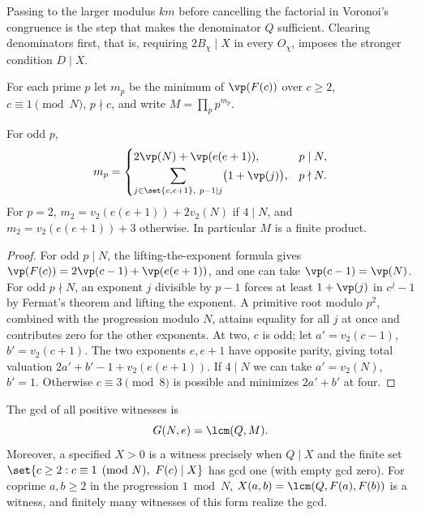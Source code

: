Passing to the larger modulus $km$ before cancelling the factorial in
Voronoi's congruence is the step that makes the denominator $Q$ sufficient.
Clearing denominators first, that is, requiring $2B_\chi\mid X$ in every
$O_\chi$, imposes the stronger condition $D\mid X$.

For each prime $p$ let $m_p$ be the minimum of $\vp(F(c))$ over $c\ge2$,
$c\equiv1\pmod N$, $p\nmid c$, and write $M=\prod_pp^{m_p}$.

\begin{lemma}\label{spn:lem:mp}
For odd $p$,
\begin{equation}\label{spn:eq:mp}
 m_p=\begin{cases}
 2\vp(N)+\vp(e(e+1)),&p\mid N,\\[2pt]
 \displaystyle\sum_{j\in\set{e,e+1},\ p-1\mid j}\bigl(1+\vp(j)\bigr),&p\nmid N .
 \end{cases}
\end{equation}
For $p=2$, $m_2=v_2(e(e+1))+2v_2(N)$ if $4\mid N$, and
$m_2=v_2(e(e+1))+3$ otherwise. In particular $M$ is a finite product.
\end{lemma}

\begin{proof}
For odd $p\mid N$, the lifting-the-exponent formula gives
$\vp(F(c))=2\vp(c-1)+\vp(e(e+1))$, and one can take $\vp(c-1)=\vp(N)$. For
odd $p\nmid N$, an exponent $j$ divisible by $p-1$ forces at least
$1+\vp(j)$ in $c^j-1$ by Fermat's theorem and lifting the exponent. A
primitive root modulo $p^2$, combined with the progression modulo $N$,
attains equality for all $j$ at once and contributes zero for the other
exponents. At two, $c$ is odd; let $a'=v_2(c-1)$, $b'=v_2(c+1)$. The two
exponents $e,e+1$ have opposite parity, giving total valuation
$2a'+b'-1+v_2(e(e+1))$. If $4\mid N$ we can take $a'=v_2(N)$, $b'=1$.
Otherwise $c\equiv3\pmod8$ is possible and minimizes $2a'+b'$ at four.
\end{proof}

\begin{theorem}\label{spn:thm:gcd}
The gcd of all positive witnesses is
\begin{equation}\label{spn:eq:G}
 G(N,e)=\lcm(Q,M).
\end{equation}
Moreover, a specified $X>0$ is a witness precisely when $Q\mid X$ and the
finite set $\set{c\ge2:c\equiv1\pmod N,\ F(c)\mid X}$ has gcd one (with empty
gcd zero). For coprime $a,b\ge2$ in the progression $1\bmod N$,
$X(a,b)=\lcm(Q,F(a),F(b))$ is a witness, and finitely many witnesses of this
form realize the gcd.
\end{theorem}

